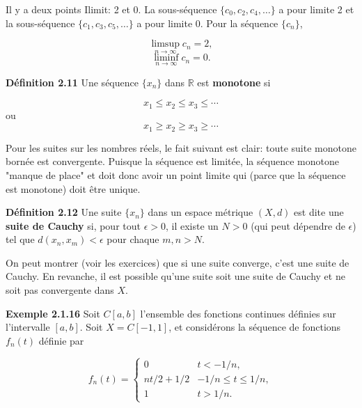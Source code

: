 \documentclass[10pt,twoside,a4paper]{book}
\begin{document}
\noindent
Il y a deux points Ilimit: 2 et 0. La sous-séquence $\{c_0, c_2, c_4, \ldots\}$ a pour limite 2 et la sous-séquence $\{c_1, c_3, c_5, \ldots\}$ a pour limite 0. Pour la séquence $\{c_n\}$,

\begin{equation*}
  \limsup_{n \longrightarrow \infty} c_n = 2,
\end{equation*}
\begin{equation*}
  \liminf_{n \longrightarrow \infty} c_n = 0.
\end{equation*}

\vspace{4mm}
\noindent
\textbf{Définition 2.11} Une séquence $\{x_n\}$ dans $\mathbb{R}$ est \textbf{monotone} si

\begin{equation*}
  x_1 \leq x_2 \leq x_3 \leq \cdots
\end{equation*}
\noindent
ou
\begin{equation*}
  x_1 \geq x_2 \geq x_3 \geq \cdots
\end{equation*}

Pour les suites sur les nombres réels, le fait suivant est clair: toute suite monotone bornée est convergente. Puisque la séquence est limitée, la séquence monotone "manque de place" et doit donc avoir un point limite qui (parce que la séquence est monotone) doit être unique.

\vspace{4mm}
\noindent
\textbf{Définition 2.12} Une suite $\{x_n\}$ dans un espace métrique $(X, d)$ est dite une \textbf{suite de Cauchy} si, pour tout $\epsilon > 0$, il existe un $N > 0$ (qui peut dépendre de $\epsilon$) tel que $d(x_n, x_m) < \epsilon$ pour chaque $m, n > N$.

\vspace{2mm}
On peut montrer (voir les exercices) que si une suite converge, c'est une suite de Cauchy. En revanche, il est possible qu'une suite soit une suite de Cauchy et ne soit pas convergente dans $X$.

\vspace{4mm}
\noindent
\textbf{Exemple 2.1.16} Soit $C[a, b]$ l'ensemble des fonctions continues définies sur l'intervalle $[a, b]$. Soit $X = C[-1, 1]$, et considérons la séquence de fonctions $f_n(t)$ définie par

\begin{equation}
  f_n(t) = \begin{cases} 0 & t < -1/n, \\
    nt/2 + 1/2 & -1/n \leq t \leq 1/n, \\
    1 & t > 1/n.
        \end{cases}
\end{equation}
\end{document}
